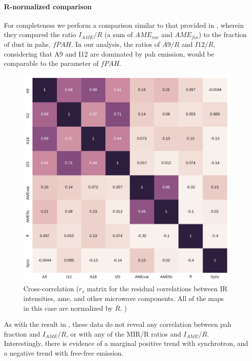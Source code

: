         \paragraph{R-normalized comparison}
            For completeness we perform a comparison similar to that provided in \cite{hensley16}, wherein they compared the ratio $I_{AME}/R$ (a sum of $AME_{var}$ and $AME_{fix}$) to the fraction of dust in \acrshort{pah}s, $fPAH$. In our analysis, the ratios of $A9/R$ and $I12/R$, considering that A9 and I12 are dominated by \acrshort{pah} emission, would be comparable to the \cite{hensley16} parameter of $fPAH$.
                \begin{figure}
                    \includegraphics[width=\textwidth/2]{../Plots/ch_allsky/all_bands_corr_matrix_wAME_spearmanR_norm_masked_hens.pdf}
                    \centering
                    \caption{Cross-correlation ($r_{s}$ matrix for the residual correlations between IR intensities, \acrshort{ame}, and other microwave components. All of the maps in this case are normalized by $R$. )}
                    \label{fig:all_bands_corr_matrix_wAME_spearmanR_norm_masked_hens}
                \end{figure}
            As with the result in \cite{hensley16}, these data do not reveal any correlation between \acrshort{pah} fraction and $I_{AME}/R$, or with any of the MIR/R ratios and $I_{AME}/R$. Interestingly, there is evidence of a marginal positive trend with synchrotron, and a negative trend with free-free emission.

